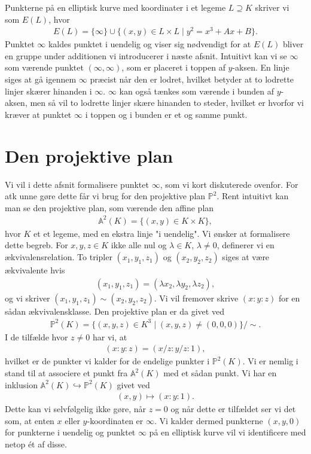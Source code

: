 Punkterne på en elliptisk kurve med koordinater i et legeme $L \supseteq K$ skriver vi som $E(L)$, hvor 
\begin{align}
\label{elliptic_curve_points}
	E(L) = \{ \infty \} \cup \{ (x, y) \in L \times L \mid y^2 = x^3 + Ax + B \}.
\end{align}
Punktet $\infty$ kaldes punktet i uendelig og viser sig nødvendigt for at $E(L)$ bliver en gruppe under additionen vi introducerer i næste afsnit. Intuitivt kan vi se $\infty$ som værende punktet $(\infty, \infty)$, som er placeret i toppen af $y$-aksen. En linje siges at gå igennem $\infty$ præcist når den er lodret, hvilket betyder at to lodrette linjer skærer hinanden i $\infty$. $\infty$ kan også tænkes som værende i bunden af $y$-aksen, men så vil to lodrette linjer skære hinanden to steder, hvilket er hvorfor vi kræver at punktet $\infty$ i toppen og i bunden er et og samme punkt.

\section{Den projektive plan}
Vi vil i dette afsnit formalisere punktet $\infty$, som vi kort diskuterede ovenfor. For atk unne gøre dette får vi brug for den projektive plan 
$\mathbb{P}^2$. Rent intuitivt kan man se den projektive plan, som
værende den affine plan 
\begin{align*}
	\mathbb{A}^2(K) = \{ (x, y) \in K \times K \},
\end{align*}
hvor $K$ et et legeme, med en ekstra linje "i uendelig". 
Vi ønsker at formalisere dette begreb. 
For $x, y, z \in K$ ikke alle nul og $\lambda \in K$, $\lambda \neq 0$, 
definerer vi en ækvivalensrelation. To tripler $(x_1, y_1, z_1)$ og 
$(x_2, y_2, z_2)$ siges at være ækvivalente hvis 
\begin{align*}
	(x_1, y_1, z_1) = (\lambda x_2, \lambda y_2, \lambda z_2),
\end{align*}
og vi skriver $(x_1, y_1, z_1) \sim (x_2, y_2, z_2)$. Vi vil fremover skrive
$(x:y:z)$ for en sådan ækvivalensklasse. Den projektive plan er da givet ved
\begin{align*}
	\mathbb{P}^2(K) = \{ (x, y, z) \in K^3 \mid (x, y, z) \neq (0, 0, 0)\}/\sim.
\end{align*}
I de tilfælde hvor $z \neq 0$ har vi, at
\begin{align*}
	(x : y : z) = (x/z : y/z : 1),
\end{align*}
hvilket er de punkter vi kalder for de endelige punkter i $\mathbb{P}^2(K)$.
Vi er nemlig i stand til at associere et punkt fra $\mathbb{A}^2(K)$ med et sådan
punkt. Vi har en inklusion $\mathbb{A}^2(K) \hookrightarrow \mathbb{P}^2(K)$ givet ved
\begin{align*}
	(x, y) \mapsto (x : y : 1).
\end{align*}
Dette kan vi selvfølgelig ikke gøre, når $z=0$ og når dette er tilfældet ser vi det som, at enten $x$ eller $y$-koordinaten er $\infty$. Vi kalder dermed punkterne
$(x, y, 0)$ for punkterne i uendelig og punktet $\infty$ på en elliptisk kurve vil vi identificere med netop ét af disse.

